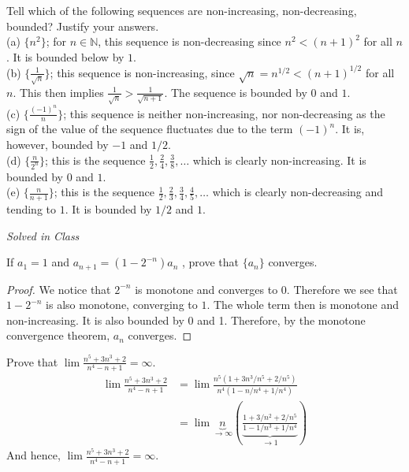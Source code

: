 \documentclass[12pt]{article}
\newcommand{\N}{\mathbb{N}}
\newenvironment{exercise}[2][Exercise]{\begin{trivlist}
\item[\hskip \labelsep {\bfseries #1}\hskip \labelsep {\bfseries #2.}]}{\end{trivlist}}
\begin{document}
\begin{exercise}{2.4.1}
Tell which of the following sequences are non-increasing, non-decreasing, bounded? Justify your answers.\\
(a) $\{n^2\}$; for $n \in \N$, this sequence is non-decreasing since $n^2 < (n+1)^2$ for all $n$. It is bounded below by $1$.\\
(b) $\{ \frac{1}{\sqrt{n}} \}$; this sequence is non-increasing, since $\sqrt{n}=n^{1/2}<(n+1)^{1/2}$ for all $n$. This then implies $\frac{1}{\sqrt{n}} > \frac{1}{\sqrt{n+1}}$. The sequence is bounded by $0$ and $1$. \\
(c) $\{ \frac{(-1)^n}{n} \}$;  this sequence is neither non-increasing, nor non-decreasing as the sign of the value of the sequence fluctuates due to the term $(-1)^n$. It is, however, bounded by $-1$ and $1/2$.\\
(d) $\{ \frac{n}{2^n} \}$; this is the sequence $\frac{1}{2},\frac{2}{4},\frac{3}{8},\hdots$ which is clearly non-increasing. It is bounded by $0$ and $1$. \\
(e) $\{ \frac{n}{n+1} \}$; this is the sequence $\frac{1}{2}, \frac{2}{3},\frac{3}{4},\frac{4}{5},\hdots$ which is clearly non-decreasing and tending to $1$. It is bounded by $1/2$ and $1$.
\end{exercise}


\begin{exercise}{2.4.2}
\emph{Solved in Class}
\end{exercise}

\begin{exercise}{2.4.3}
If $a_1 = 1$ and $a_{n+1} = (1-2^{-n})a_n$ , prove that $\{a_n\}$ converges.
	\begin{proof}
We notice that $2^{-n}$ is monotone and converges to $0$. Therefore we see that $1-2^{-n}$ is also monotone, converging to $1$. The whole term then is monotone and non-increasing. It is also bounded by 0 and 1. Therefore, by the monotone convergence theorem, $a_n$ converges.
	\end{proof}
\end{exercise}


\begin{exercise}{2.4.8}
Prove that $\lim \frac{n^5 + 3n^3 + 2}{n^4 -n+1}= \infty$. 
	\begin{align*}
	\lim \frac{n^5 + 3n^3 + 2}{n^4 -n+1} &= \lim \frac{n^5(1+3n^3/n^5+2/n^5)}{n^4(1-n/n^4+1/n^4)}\\
	&= \lim \underbrace{n}_\text{$\to \infty$} (\underbrace{\frac{1+3/n^2+2/n^5}{1-1/n^3+1/n^4}}_\text{$\to 1$})
	\end{align*}
And hence, $\lim \frac{n^5 + 3n^3 + 2}{n^4 -n+1}= \infty$.
\end{exercise}
\end{document}
